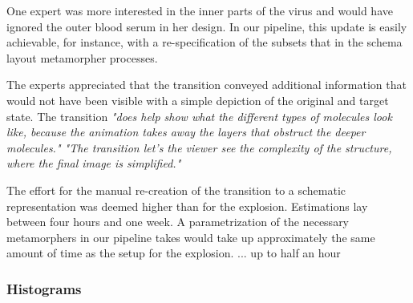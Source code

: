 One expert was more interested in the inner parts of the virus and would have ignored the outer blood serum in her design. In our pipeline, this update is easily achievable, for instance, with a re-specification of the subsets that in the schema layout metamorpher processes. 

The experts appreciated that the transition conveyed additional information that would not have been visible with a simple depiction of the original and target state.
The transition \textit{"does help show what the different types of molecules look like, because the animation takes away the layers that obstruct the deeper molecules."
"The transition let's the viewer see the complexity of the structure, where the final image is simplified."}








The effort for the manual re-creation of the transition to a schematic representation was deemed higher than for the explosion. Estimations lay between four hours and one week. A parametrization of the necessary metamorphers in our pipeline takes would take up approximately the same amount of time as the setup for the explosion. ... up to half an hour









\subsubsection{Histograms}

